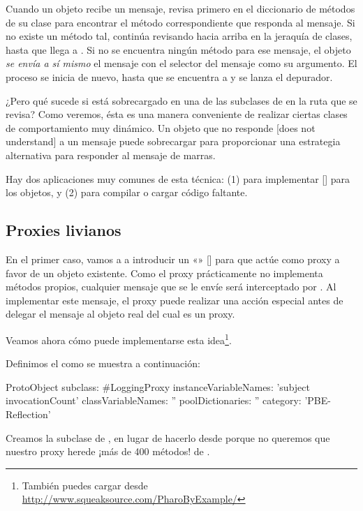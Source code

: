 \documentclass[a4paper,10pt,twoside]{book}
\begin{document}
Cuando un objeto recibe un mensaje, revisa primero en el diccionario
de métodos de su clase para encontrar el método correspondiente que
responda al mensaje.  Si no existe un método tal, continúa revisando
hacia arriba en la jeraquía de clases, hasta que llega a .
Si no se encuentra ningún método para ese mensaje, el objeto \emph{se
  envía a sí mismo} el mensaje  con el selector
del mensaje como su argumento.  El proceso se inicia de nuevo, hasta
que se encuentra a  y se lanza
el depurador.

¿Pero qué sucede si  está sobrecargado en una
de las subclases de  en la ruta que se revisa?  Como
veremos, ésta es una manera conveniente de realizar ciertas clases de
comportamiento muy dinámico.  Un objeto que no responde [does not
understand] a un mensaje puede sobrecargar 
para proporcionar una estrategia alternativa para responder al mensaje
de marras.

Hay dos aplicaciones muy comunes de esta técnica: (1) para implementar
 [] para los objetos, y
(2) para compilar o cargar código faltante.

\subsection{Proxies livianos}

En el primer caso, vamos a a introducir un «»
[] para que actúe como proxy a favor de un objeto
existente.  Como el proxy prácticamente no implementa métodos propios,
cualquier mensaje que se le envíe será interceptado por
.  Al implementar este mensaje, el proxy puede
realizar una acción especial antes de delegar el mensaje al objeto
real del cual es un proxy.

Veamos ahora cómo puede implementarse esta idea\footnote{También
  puedes cargar  desde
  \url{http://www.squeaksource.com/PharoByExample/}}.

Definimos el  como se muestra a continuación:
\begin{code}{}
ProtoObject subclass: #LoggingProxy
        instanceVariableNames: 'subject invocationCount'
        classVariableNames: ''
        poolDictionaries: ''
        category: 'PBE-Reflection'
\end{code}
Creamos la subclase de , en lugar de hacerlo desde
 porque no queremos que nuestro proxy herede ¡más de 400
métodos! de .
\end{document}
